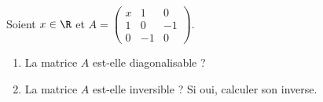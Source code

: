 \begin{enonce}
\begin{exercise}[ID={RMS135 E1415},subtitle={IMT MP 2024},tags={},difficulty={}]
Soient $x \in \R$ et $A = \begin{pmatrix}
x & 1 & 0 \\
1 & 0 & -1 \\
0 & -1 & 0
\end{pmatrix}$.
\begin{enumerate}
  \item La matrice $A$ est-elle diagonalisable ?
  \item La matrice $A$ est-elle inversible ? Si oui, calculer son inverse.
\end{enumerate}
\end{exercise}
\begin{solution}
\end{solution}
\end{enonce}
